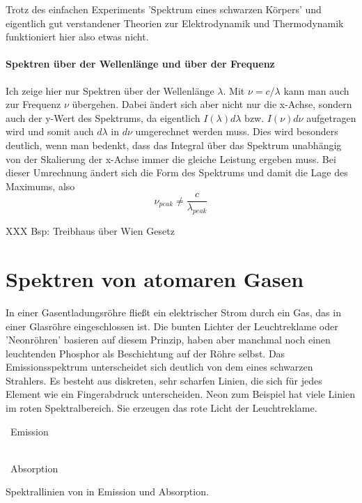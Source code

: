 Trotz des einfachen Experiments 'Spektrum eines schwarzen Körpers' und eigentlich gut verstandener Theorien zur Elektrodynamik und Thermodynamik funktioniert hier also etwas nicht.


\paragraph*{Spektren über der Wellenlänge und über der Frequenz} Ich zeige hier nur Spektren über der Wellenlänge $\lambda$. Mit $\nu = c / \lambda$ kann man auch zur Frequenz $\nu$ übergehen. Dabei ändert sich aber nicht nur die x-Achse, sondern auch der y-Wert des Spektrums, da eigentlich $I(\lambda) d\lambda$ bzw. $I(\nu) d\nu$ aufgetragen wird und somit auch $d\lambda$ in $d\nu$ umgerechnet werden muss. Dies wird besonders deutlich, wenn man bedenkt, dass das Integral über das Spektrum unabhängig von der Skalierung der x-Achse immer die gleiche Leistung ergeben muss. Bei dieser Umrechnung ändert sich die Form des Spektrums und damit die Lage des Maximums, also 
\begin{equation}
    \nu_{peak} \neq \frac{c}{\lambda_{peak}}
\end{equation}

XXX Bsp: Treibhaus über Wien Gesetz

\section{Spektren von atomaren Gasen}

In einer Gasentladungsröhre fließt ein elektrischer Strom durch ein Gas, das in einer Glasröhre eingeschlossen ist. Die bunten Lichter der Leuchtreklame oder 'Neonröhren' basieren auf diesem Prinzip, haben aber manchmal noch einen leuchtenden Phosphor als Beschichtung auf der Röhre selbst. Das Emissionsspektrum unterscheidet sich deutlich von dem eines schwarzen Strahlers. Es besteht aus diskreten, sehr scharfen Linien, die sich für jedes Element wie ein Fingerabdruck unterscheiden. Neon zum Beispiel hat viele Linien im roten Spektralbereich. Sie erzeugen das rote Licht der Leuchtreklame.

\begin{marginfigure}
    \ Emission

    \pgfspectra[width=\textwidth ,element=Ne , Imin=0.2]

    \ \\

   \  Absorption

   \pgfspectra[width=\textwidth ,absorption, lines={585.2  , 692.9}]

\caption{Spektrallinien von  in Emission und Absorption.}

\end{marginfigure}

